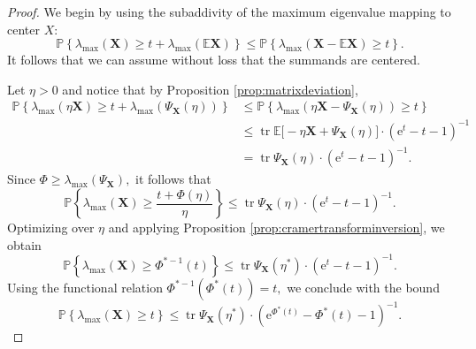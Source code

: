 \documentclass[reqno]{amsart}
\newcommand{\mat}[1]{\ensuremath{\bm{#1}}} %
\newcommand{\e}{\ensuremath{\mathrm{e}}}
\newcommand{\E}{\ensuremath{\mathbb{E}}}
\newcommand{\Prob}[1]{\ensuremath{\mathbb{P}\left\{#1\right\}}}
\newcommand{\lambdamax}[1]{\ensuremath{\lambda_{\mathrm{max}}\left(#1\right)}}
\DeclareMathOperator{\tr}{tr}
\theoremstyle{remark}
\begin{document}
\begin{proof}
We begin by using the subaddivity of the maximum eigenvalue mapping to center $X:$
\[
\Prob{\lambdamax{\mat{X}} \geq t + \lambdamax{\E\mat{X}}} \leq \Prob{ \lambdamax{\mat{X} - \E \mat{X}} \geq t }. 
\]
It follows that we can assume without loss that the summands are centered.

Let $\eta > 0$ and notice that by Proposition \ref{prop:matrixdeviation},
\begin{align*}
\Prob{\lambdamax{\eta \mat{X}} \geq t + \lambdamax{\Psi_{\mat{X}}(\eta)}} & \leq \Prob{\lambdamax{\eta \mat{X} - \Psi_{\mat{X}}(\eta)} \geq t} \\
& \leq \tr \E\big[ -\eta \mat{X} + \Psi_{\mat{X}}(\eta) \big] \cdot (\e^t - t - 1)^{-1} \\
&= \tr \Psi_{\mat{X}}(\eta) \cdot(\e^t -t -1)^{-1}.
\end{align*}
Since $\Phi \geq \lambdamax{\Psi_{\mat{X}}},$ it follows that
\[
\Prob{\lambdamax{\mat{X}} \geq \frac{t + \Phi(\eta)}{\eta} } \leq \tr \Psi_{\mat{X}}(\eta) \cdot (\e^t - t - 1)^{-1}.
\]
Optimizing over $\eta$ and applying Proposition \ref{prop:cramertransforminversion}, we obtain
\[
\Prob{\lambdamax{\mat{X}} \geq \Phi^{*-1}(t)} \leq \tr \Psi_{\mat{X}}(\eta^*) \cdot (\e^t - t - 1)^{-1}.
\]
Using the functional relation $\Phi^{*-1}(\Phi^*(t)) = t,$ we conclude with the bound
\[
\Prob{\lambdamax{\mat{X}} \geq t} \leq \tr \Psi_{\mat{X}}(\eta^*) \cdot (\e^{\Phi^*(t)} - \Phi^*(t) - 1)^{-1}.
\] 
\end{proof}



\end{document}

